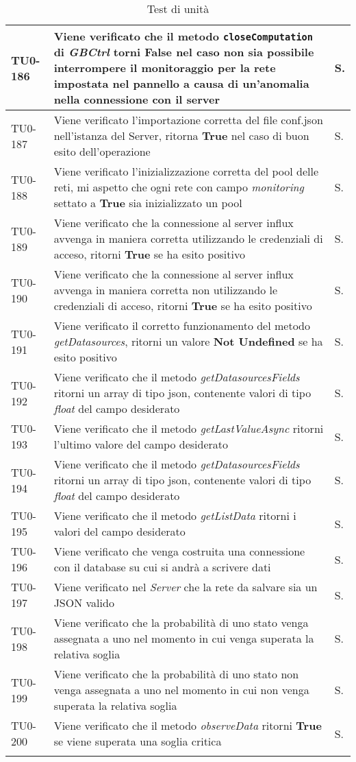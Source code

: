 \begin{longtable}{|C{.15\textwidth}|m{.66\textwidth}|C{.10\textwidth}|}
\hline
TU0-186 & Viene verificato che il metodo \texttt{closeComputation} di \textit{GBCtrl} torni \textbf{False} nel caso non sia possibile interrompere il monitoraggio per la rete impostata nel pannello a causa di un'anomalia nella connessione con il server & S.\\
\hline
{}TU0-187 & Viene verificato l'importazione corretta del file conf.json nell'istanza del Server, ritorna \textbf{True} nel caso di buon esito dell'operazione & S.\\
\hline
TU0-188 & Viene verificato l'inizializzazione corretta del pool delle reti, mi aspetto che ogni rete con campo \textit{monitoring} settato a \textbf{True} sia inizializzato un pool & S.\\
\hline
{}TU0-189 & Viene verificato che la connessione al server influx avvenga in maniera corretta utilizzando le credenziali di acceso, ritorni \textbf{True} se ha esito positivo & S.\\
\hline
TU0-190 & Viene verificato che la connessione al server influx avvenga in maniera corretta non utilizzando le credenziali di acceso, ritorni \textbf{True} se ha esito positivo & S.\\
\hline
{}TU0-191 & Viene verificato il corretto funzionamento del metodo \textit{getDatasources}, ritorni un valore \textbf{Not Undefined} se ha esito positivo & S.\\
\hline
TU0-192 & Viene verificato che il metodo \textit{getDatasourcesFields} ritorni un array di tipo json, contenente valori di tipo \textit{float} del campo desiderato & S.\\
\hline
{}TU0-193 & Viene verificato che il metodo \textit{getLastValueAsync} ritorni l'ultimo valore del campo desiderato & S.\\
\hline
TU0-194 & Viene verificato che il metodo \textit{getDatasourcesFields} ritorni un array di tipo json, contenente valori di tipo \textit{float} del campo desiderato & S.\\
\hline
{}TU0-195 & Viene verificato che il metodo \textit{getListData} ritorni i valori del campo desiderato & S.\\
\hline
TU0-196 & Viene verificato che venga costruita una connessione con il database su cui si andrà a scrivere dati & S.\\
\hline
{}TU0-197 & Viene verificato nel \textit{Server} che la rete da salvare sia un JSON valido & S.\\
\hline
TU0-198 & Viene verificato che la probabilità di uno stato venga assegnata a uno nel momento in cui venga superata la relativa soglia & S.\\
\hline
{}TU0-199 & Viene verificato che la probabilità di uno stato non venga assegnata a uno nel momento in cui non venga superata la relativa soglia & S.\\
\hline
TU0-200 & Viene verificato che il metodo \textit{observeData} ritorni \textbf{True} se viene superata una soglia critica & S.\\
\hline
\caption{Test di unità}



\end{longtable}

